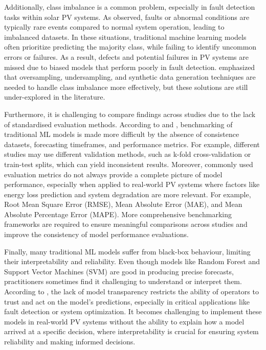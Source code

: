 Additionally, class imbalance is a common problem, especially in fault detection tasks within solar PV systems. As \parencite{Kumar et al._2020} observed, faults or abnormal conditions are typically rare events compared to normal system operation, leading to imbalanced datasets. In these situations, traditional machine learning models often prioritize predicting the majority class, while failing to identify uncommon errors or failures. As a result, defects and potential failures in PV systems are missed due to biased models that perform poorly in fault detection. \parencite{De Silva et al._2024} emphasized that oversampling, undersampling, and synthetic data generation techniques are needed to handle class imbalance more effectively, but these solutions are still under-explored in the literature.

Furthermore, it is challenging to compare findings across studies due to the lack of standardised evaluation methods. According to \parencite{Zhang et al._2020} and \parencite{Shen et al._2020}, benchmarking of traditional ML models is made more difficult by the absence of consistence datasets, forecasting timeframes, and performance metrics. For example, different studies may use different validation methods, such as k-fold cross-validation or train-test splits, which can yield inconsistent results. Moreover, commonly used evaluation metrics do not always provide a complete picture of model performance, especially when applied to real-world PV systems where factors like energy loss prediction and system degradation are more relevant. For example, Root Mean Square Error (RMSE), Mean Absolute Error (MAE), and Mean Absolute Percentage Error (MAPE). More comprehensive benchmarking frameworks are required to ensure meaningful comparisons across studies and improve the consistency of model performance evaluations. 

Finally, many traditional ML models suffer from black-box behaviour, limiting their interpretability and reliability. Even though models like Random Forest and Support Vector Machines (SVM) are good in producing precise forecasts, practitioners sometimes find it challenging to understand or interpret them. According to \parencite{Siddiqui et al._2020}, the lack of model transparency restricts the ability of operators to trust and act on the model’s predictions, especially in critical applications like fault detection or system optimization. It becomes challenging to implement these models in real-world PV systems without the ability to explain how a model arrived at a specific decision, where interpretability is crucial for ensuring system reliability and making informed decisions.

